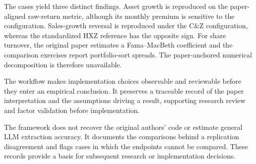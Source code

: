 The cases yield three distinct findings. Asset growth is reproduced on the
paper-aligned raw-return metric, although its monthly premium is sensitive to
the configuration. Sales-growth reversal is reproduced under the C\&Z
configuration, whereas the standardized HXZ reference has the opposite sign.
For share turnover, the original paper estimates a Fama--MacBeth
coefficient and the comparison exercises report portfolio-sort spreads. The
paper-anchored numerical decomposition is therefore unavailable.

The workflow makes implementation choices observable and reviewable before
they enter an empirical conclusion. It preserves a traceable record of the
paper interpretation and the assumptions driving a result, supporting research
review and factor validation before implementation.

The framework does not recover the original authors' code or estimate general
LLM extraction accuracy. It documents the comparisons behind a replication
disagreement and flags cases in which the endpoints cannot be compared. These
records provide a basis for subsequent research or implementation decisions.
